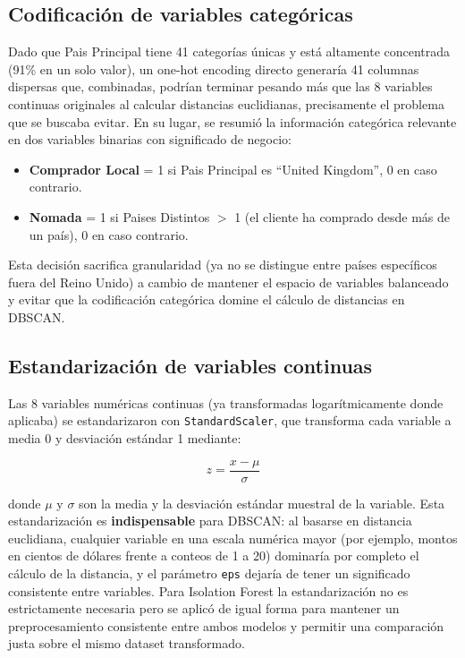 \documentclass[11pt]{article}
\begin{document}
\subsection*{Codificación de variables categóricas}

Dado que Pais Principal tiene 41 categorías únicas y está altamente concentrada (91\% en un solo valor),
un one-hot encoding directo generaría 41 columnas dispersas que, combinadas, podrían terminar
pesando más que las 8 variables continuas originales al calcular distancias euclidianas, precisamente el
problema que se buscaba evitar. En su lugar, se resumió la información categórica relevante en dos
variables binarias con significado de negocio:

\begin{itemize}
    \item \textbf{Comprador Local} = 1 si Pais Principal es ``United Kingdom'', 0 en caso contrario.
    \item \textbf{Nomada} = 1 si Paises Distintos $>$ 1 (el cliente ha comprado desde más de un país), 0 en caso contrario.
\end{itemize}

Esta decisión sacrifica granularidad (ya no se distingue entre países específicos fuera del Reino Unido) a
cambio de mantener el espacio de variables balanceado y evitar que la codificación categórica domine el
cálculo de distancias en DBSCAN.

\subsection*{Estandarización de variables continuas}

Las 8 variables numéricas continuas (ya transformadas logarítmicamente donde aplicaba) se
estandarizaron con \texttt{StandardScaler}, que transforma cada variable a media 0 y desviación estándar 1
mediante:

\begin{equation}
z = \frac{x - \mu}{\sigma}
\end{equation}

donde $\mu$ y $\sigma$ son la media y la desviación estándar muestral de la variable. Esta estandarización es
\textbf{indispensable} para DBSCAN: al basarse en distancia euclidiana, cualquier variable en una escala numérica
mayor (por ejemplo, montos en cientos de dólares frente a conteos de 1 a 20) dominaría por completo el
cálculo de la distancia, y el parámetro \texttt{eps} dejaría de tener un significado consistente entre variables. Para
Isolation Forest la estandarización no es estrictamente necesaria pero se aplicó de igual forma para
mantener un preprocesamiento consistente entre ambos modelos y permitir una comparación justa sobre
el mismo dataset transformado.
\end{document}
